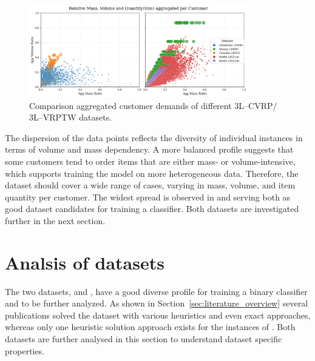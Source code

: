 \begin{figure}[ht]
	\centering
	\includegraphics[width=0.85\textwidth]{pictures/comparison_datasets_3lcvrp.png}
	\caption{Comparison aggregated customer demands of different 3L--CVRP/ 3L--VRPTW datasets.}
	\label{fig:dataset_comparison}
\end{figure}

The dispersion of the data points reflects the diversity of individual instances in terms of volume
and mass dependency. A more balanced profile suggests that some customers tend to order items that
are either mass- or volume-intensive, which supports training the model on more heterogeneous data.
Therefore, the dataset should cover a wide range of cases, varying in mass, volume, and item
quantity per customer. The widest spread is observed in \krebsADataSetText and \gendreauDataSetText serving
both as good dataset candidates for training a classifier. Both datasets are investigated further in
the next section.

\section{Analsis of datasets}
\label{sec:analysis_datasets}

The two datasets, \krebsADataSetText and \gendreauDataSet, have a good diverse profile for training
a binary classifier and to be further analyzed.
As shown in Section~\ref{sec:literature_overview} several publications solved the \gendreauDataSetText dataset
with various heuristics and even exact approaches, whereas only one heuristic solution approach exists for the instances of \krebsADataSet.
Both datasets are further analysed in this section to understand dataset specific properties.

\subsubsection{\krebsADataSetText}

